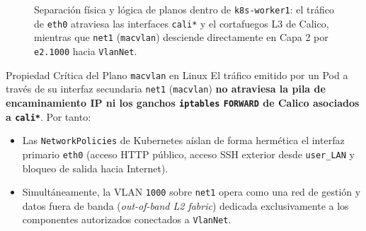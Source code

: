 \begin{figure}[H]
{%
}
\caption{Separación física y lógica de planos dentro de \texttt{k8s-worker1}: el tráfico de \texttt{eth0} atraviesa las interfaces \texttt{cali*} y el cortafuegos L3 de Calico, mientras que \texttt{net1} (\texttt{macvlan}) desciende directamente en Capa 2 por \texttt{e2.1000} hacia \texttt{VlanNet}.}
\label{fig:arquitectura-worker1}
\end{figure}

\begin{warnbox}{Propiedad Crítica del Plano \texttt{macvlan} en Linux}
El tráfico emitido por un Pod a través de su interfaz secundaria \texttt{net1} (\texttt{macvlan}) \textbf{no atraviesa la pila de encaminamiento IP ni los ganchos \texttt{iptables} \texttt{FORWARD} de Calico asociados a \texttt{cali*}}. Por tanto:
\begin{itemize}
  \item Las \texttt{NetworkPolicies} de Kubernetes aíslan de forma hermética el interfaz primario \texttt{eth0} (acceso HTTP público, acceso SSH exterior desde \texttt{user\_LAN} y bloqueo de salida hacia Internet).
  \item Simultáneamente, la VLAN \texttt{1000} sobre \texttt{net1} opera como una red de gestión y datos fuera de banda (\textit{out-of-band L2 fabric}) dedicada exclusivamente a los componentes autorizados conectados a \texttt{VlanNet}.
\end{itemize}
\end{warnbox}

